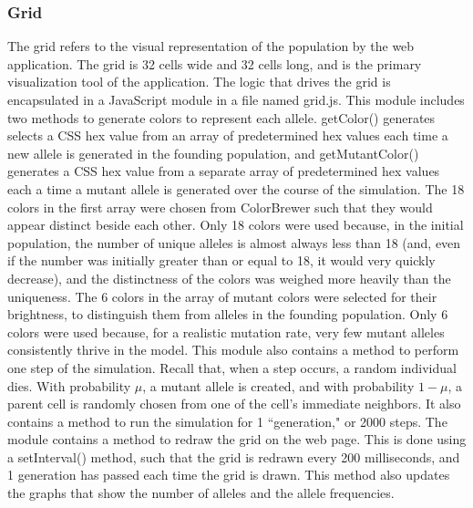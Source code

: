 \documentclass[12pt]{article}
\begin{document}
\begin{spacing}{1.5}
\subsubsection{Grid}
The grid refers to the visual representation of the population by the web application. The grid is 32 cells wide and 32 cells long, and is the primary visualization tool of the application. The logic that drives the grid is encapsulated in a JavaScript module in a file named grid.js.\newline
\newline
This module includes two methods to generate colors to represent each allele. getColor() generates selects a CSS hex value from an array of predetermined hex values each time a new allele is generated in the founding population, and getMutantColor() generates a CSS hex value from a separate array of predetermined hex values each a time a mutant allele is generated over the course of the simulation. The 18 colors in the first array were chosen from ColorBrewer such that they would appear distinct beside each other. Only 18 colors were used because, in the initial population, the number of unique alleles is almost always less than 18 (and, even if the number was initially greater than or equal to 18, it would very quickly decrease), and the distinctness of the colors was weighed more heavily than the uniqueness. The 6 colors in the array of mutant colors were selected for their brightness, to distinguish them from alleles in the founding population. Only 6 colors were used because, for a realistic mutation rate, very few mutant alleles consistently thrive in the model.\newline
\newline
This module also contains a method to perform one step of the simulation. Recall that, when a step occurs, a random individual dies. With probability $\mu$, a mutant allele is created, and with probability $1 - \mu$, a parent cell is randomly chosen from one of the cell's immediate neighbors. It also contains a method to run the simulation for 1 ``generation," or 2000 steps.\newline
\newline
The module contains a method to redraw the grid on the web page. This is done using a setInterval() method, such that the grid is redrawn every 200 milliseconds, and 1 generation has passed each time the grid is drawn. This method also updates the graphs that show the number of alleles and the allele frequencies.\newline
\newline

\end{spacing}
\end{document}
